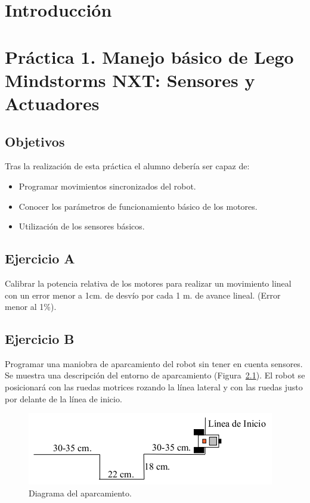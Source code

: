 
\chapter{Introducción}

\chapter{Práctica 1. Manejo básico de Lego Mindstorms NXT: Sensores y Actuadores}

\section{Objetivos}

Tras la realización de esta práctica el alumno debería ser capaz de:
\begin{itemize}
	\item Programar movimientos sincronizados del robot. 
	\item Conocer los parámetros de funcionamiento básico de los motores. 
	\item Utilización  de los sensores básicos. 
\end{itemize}

\section{Ejercicio A}
Calibrar la potencia relativa de los motores para realizar un movimiento lineal con un error menor a 1cm. de desvío por cada 1 m. de avance lineal. (Error menor al 1\%).

\section{Ejercicio B}

\par Programar una maniobra de aparcamiento del robot sin tener en cuenta sensores. Se muestra una descripción del entorno de aparcamiento (Figura~\ref{aparcamiento}). El robot se posicionará con las ruedas motrices rozando la línea lateral y con las ruedas justo por delante de la línea de inicio.

\begin{figure}[ht!]
 \centering
 \includegraphics[scale=0.7]{./img/recorrido1.png}
 \caption{Diagrama del aparcamiento.}
 \label{aparcamiento}
\end{figure}


